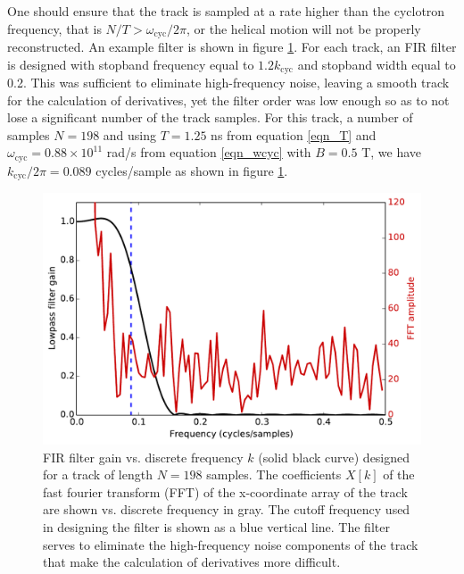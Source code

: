 \documentclass{JINST}
\begin{document}
One should ensure that the track is sampled at a rate higher than the cyclotron
frequency, that is $N/T > \omega_{\mathrm{cyc}}/2\pi$, or the helical motion will not be properly
reconstructed.  An example filter is shown in figure \ref{fig_FIR}.  For each track, an FIR filter is designed with 
stopband frequency equal to $1.2k_{\mathrm{cyc}}$ and stopband width equal to 0.2.  This was sufficient to 
eliminate high-frequency noise, leaving a smooth track for the calculation of derivatives, yet the filter order was
low enough so as to not lose a significant number of the track samples.  For this track, a number of samples 
$N = 198$ and using $T = 1.25$ ns from equation \ref{eqn_T} and $\omega_{\mathrm{cyc}} = 0.88 \times 
10^{11}$ rad/s from equation \ref{eqn_wcyc} with $B = 0.5$ T, we have $k_{\mathrm{cyc}}/2\pi = 0.089$ cycles/sample 
as shown in figure \ref{fig_FIR}.

\begin{figure}[!htb]
	\centering
	\includegraphics[scale=0.48]{fig/FIR_freq_resp_nmagse2_6.pdf}
	\caption{\label{fig_FIR}FIR filter gain vs. discrete frequency $k$ (solid black curve) designed for a track of length $N = 198$ samples.  The coefficients $X[k]$ of the fast fourier transform (FFT) of the x-coordinate array of the track are shown vs. discrete frequency in gray.  The cutoff frequency used in designing the filter is shown as a blue vertical line.  The filter serves to eliminate the high-frequency noise components of the track that make the calculation of derivatives more difficult.}
\end{figure}
\end{document}
